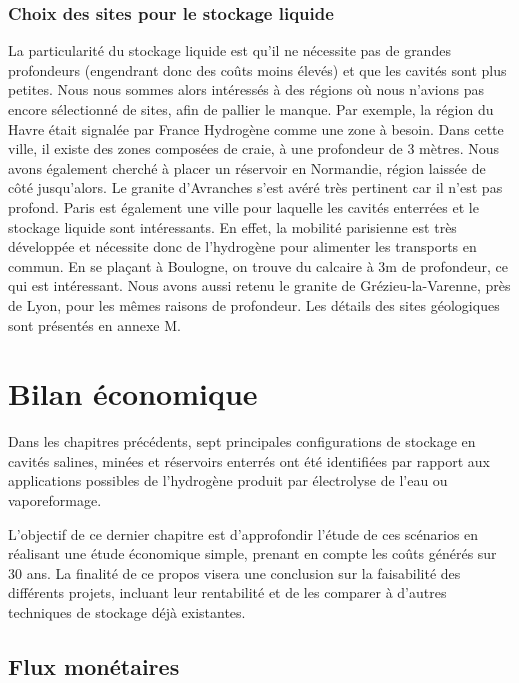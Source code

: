 \documentclass[11pt,french,a4paper]{article}
\begin{document}
\subsubsection{Choix des sites pour le stockage liquide}
La particularité du stockage liquide est qu’il ne nécessite pas de grandes profondeurs (engendrant donc des coûts moins élevés) et que les cavités sont plus petites. 
Nous nous sommes alors intéressés à des régions où nous n’avions pas encore sélectionné de sites, afin de pallier le manque. Par exemple, la région du Havre était signalée par France Hydrogène comme une zone à besoin. Dans cette ville, il existe des zones composées de craie, à une profondeur de 3 mètres. Nous avons également cherché à placer un réservoir en Normandie, région laissée de côté jusqu’alors. Le granite d’Avranches s’est avéré très pertinent car il n’est pas profond.
Paris est également une ville pour laquelle les cavités enterrées et le stockage liquide sont intéressants. En effet, la mobilité parisienne est très développée et nécessite donc de l’hydrogène pour alimenter les transports en commun. En se plaçant à Boulogne, on trouve du calcaire à 3m de profondeur, ce qui est intéressant. 
Nous avons aussi retenu le granite de Grézieu-la-Varenne, près de Lyon, pour les mêmes raisons de profondeur. Les détails des sites géologiques sont présentés en annexe M.







\section{Bilan économique}
Dans les chapitres précédents, sept principales configurations de stockage en cavités salines, minées et réservoirs enterrés ont été identifiées par rapport aux applications possibles de l'hydrogène produit par électrolyse de l’eau ou vaporeformage.

L’objectif de ce dernier chapitre est d’approfondir l’étude de ces scénarios en réalisant une étude économique simple, prenant en compte les coûts générés sur 30 ans. La finalité de ce propos visera une conclusion sur la faisabilité des différents projets, incluant leur rentabilité et de les comparer à d’autres techniques de stockage déjà existantes.

\subsection{Flux monétaires}
\end{document}
